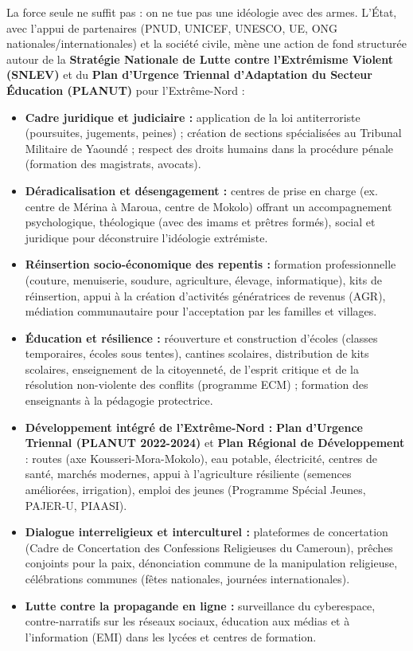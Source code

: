 \documentclass[11pt]{article}
\newcounter{popsec}
\newcounter{popsub}
\newcommand{\courssub}[1]{%
  \stepcounter{popsub}%
  \par\vspace{9pt}\noindent{\popxbold\fontsize{11.5}{13}\selectfont\color{popink}{\color{poporange}\thepopsec.\thepopsub}\hspace{6pt}#1}\par\nopagebreak\vspace{4pt}
}
\begin{document}
\courssub{La réponse préventive, sociale et juridique}

La force seule ne suffit pas : on ne tue pas une idéologie avec des armes. L'État, avec l'appui de partenaires (PNUD, UNICEF, UNESCO, UE, ONG nationales/internationales) et la société civile, mène une action de fond structurée autour de la \textbf{Stratégie Nationale de Lutte contre l'Extrémisme Violent (SNLEV)} et du \textbf{Plan d'Urgence Triennal d'Adaptation du Secteur Éducation (PLANUT)} pour l'Extrême-Nord :

\begin{itemize}
\item \textbf{Cadre juridique et judiciaire :} application de la loi antiterroriste (poursuites, jugements, peines) ; création de sections spécialisées au Tribunal Militaire de Yaoundé ; respect des droits humains dans la procédure pénale (formation des magistrats, avocats).
\item \textbf{Déradicalisation et désengagement :} centres de prise en charge (ex. centre de Mérina à Maroua, centre de Mokolo) offrant un accompagnement psychologique, théologique (avec des imams et prêtres formés), social et juridique pour déconstruire l'idéologie extrémiste.
\item \textbf{Réinsertion socio-économique des repentis :} formation professionnelle (couture, menuiserie, soudure, agriculture, élevage, informatique), kits de réinsertion, appui à la création d'activités génératrices de revenus (AGR), médiation communautaire pour l'acceptation par les familles et villages.
\item \textbf{Éducation et résilience :} réouverture et construction d'écoles (classes temporaires, écoles sous tentes), cantines scolaires, distribution de kits scolaires, enseignement de la citoyenneté, de l'esprit critique et de la résolution non-violente des conflits (programme ECM) ; formation des enseignants à la pédagogie protectrice.
\item \textbf{Développement intégré de l'Extrême-Nord :} \textbf{Plan d'Urgence Triennal (PLANUT 2022-2024)} et \textbf{Plan Régional de Développement} : routes (axe Kousseri-Mora-Mokolo), eau potable, électricité, centres de santé, marchés modernes, appui à l'agriculture résiliente (semences améliorées, irrigation), emploi des jeunes (Programme Spécial Jeunes, PAJER-U, PIAASI).
\item \textbf{Dialogue interreligieux et interculturel :} plateformes de concertation (Cadre de Concertation des Confessions Religieuses du Cameroun), prêches conjoints pour la paix, dénonciation commune de la manipulation religieuse, célébrations communes (fêtes nationales, journées internationales).
\item \textbf{Lutte contre la propagande en ligne :} surveillance du cyberespace, contre-narratifs sur les réseaux sociaux, éducation aux médias et à l'information (EMI) dans les lycées et centres de formation.
\end{itemize}
\end{document}
